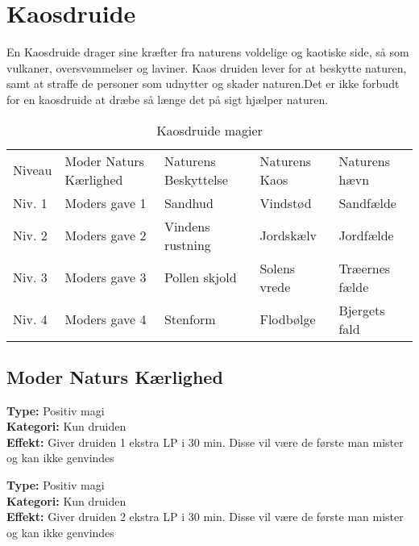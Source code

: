 \chapter{Kaosdruide}
En Kaosdruide drager sine kræfter fra naturens voldelige og kaotiske side, så som vulkaner, oversvømmelser og laviner. Kaos druiden lever for at beskytte naturen, samt at straffe de personer som udnytter og skader naturen.Det er ikke forbudt for en kaosdruide at dræbe så længe det på sigt hjælper naturen.

\begin{table}[H]
    \centering
    \begin{tabular}{|p{}|p{}|p{}|p{}|p{}|}
    \hline
    \rowcolor{cerulean!80}
    \multicolumn{5}{c}{Kaosdruide magi}\\
    \hline
    \rowcolor{cerulean!40}
         Niveau &Moder Naturs Kærlighed & Naturens Beskyttelse & Naturens Kaos & Naturens hævn \\\hline
        Niv. 1 & Moders gave 1 & Sandhud & Vindstød & Sandfælde\\\hline
        Niv. 2 & Moders gave 2& Vindens rustning & Jordskælv & Jordfælde \\\hline
         Niv. 3 & Moders gave 3 & Pollen skjold & Solens vrede & Træernes fælde \\\hline
         Niv. 4 & Moders gave 4 & Stenform & Flodbølge & Bjergets fald\\\hline
         \end{tabular}
         \caption{Kaosdruide magier}
\end{table}

\section{Moder Naturs Kærlighed}
\begin{mkær*}
\textbf{Type:} Positiv magi\\
\textbf{Kategori:} Kun druiden\\
\textbf{Effekt:} Giver druiden 1 ekstra LP i 30 min. Disse vil være de første man mister og kan ikke genvindes
\end{mkær*}

\begin{mkær*}
\textbf{Type:} Positiv magi\\ 
\textbf{Kategori:} Kun druiden\\
\textbf{Effekt:} Giver druiden 2 ekstra LP i 30 min. Disse vil være de første man mister og kan ikke genvindes
\end{mkær*}

